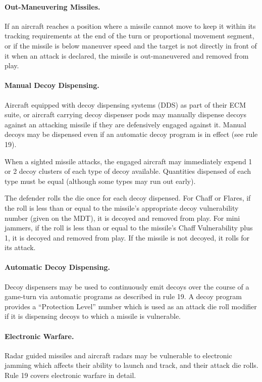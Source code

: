 \paragraph{Out-Maneuvering Missiles.} If an aircraft reaches a position where a missile cannot move to keep it within its tracking requirements at the end of the turn or proportional movement segment, or if the missile is below maneuver speed and the target is not directly in front of it when an attack is declared, the missile is out-maneuvered and removed from play.

\paragraph{Manual Decoy Dispensing.} Aircraft equipped with decoy dispensing systems (DDS) as part of their ECM suite, or aircraft carrying decoy dispenser pods may manually dispense decoys against an attacking missile if they are defensively engaged against it. Manual decoys may be dispensed even if an automatic decoy program is in effect (see rule 19).

When a sighted missile attacks, the engaged aircraft may immediately expend 1 or 2 decoy clusters of each type of decoy available. Quantities dispensed of each type must be equal (although some types may run out early).

The defender rolls the die once for each decoy dispensed. For Chaff or Flares, if the roll is less than or equal to the missile's appropriate decoy vulnerability number (given on the MDT), it is decoyed and removed from play. For mini jammers, if the roll is less than or equal to the missile's Chaff Vulnerability plus 1, it is decoyed and removed from play. If the missile is not decoyed, it rolls for its attack.

\paragraph{Automatic Decoy Dispensing.} Decoy dispensers may be used to continuously emit decoys over the course of a game-turn via automatic programs as described in rule 19. A decoy program provides a “Protection Level” number which is used as an attack die roll modifier if it is dispensing decoys to which a missile is vulnerable.

\paragraph{Electronic Warfare.} Radar guided missiles and aircraft radars may be vulnerable to electronic jamming which affects their ability to launch and track, and their attack die rolls. Rule 19 covers electronic warfare in detail.

